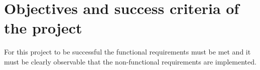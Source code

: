 \section{Objectives and success criteria of the project}
For this project to be successful the functional requirements must be met and it must be clearly observable that the non-functional requirements are implemented. 